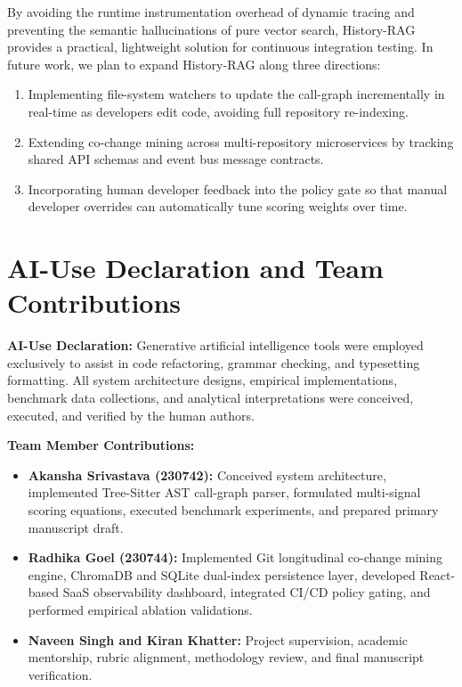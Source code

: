 \documentclass[12pt,onecolumn,draftclsnofoot]{IEEEtran}
\begin{document}
By avoiding the runtime instrumentation overhead of dynamic tracing and preventing the semantic hallucinations of pure vector search, History-RAG provides a practical, lightweight solution for continuous integration testing. In future work, we plan to expand History-RAG along three directions:
\begin{enumerate}
    \item Implementing file-system watchers to update the call-graph incrementally in real-time as developers edit code, avoiding full repository re-indexing.
    \item Extending co-change mining across multi-repository microservices by tracking shared API schemas and event bus message contracts.
    \item Incorporating human developer feedback into the policy gate so that manual developer overrides can automatically tune scoring weights over time.
\end{enumerate}

\section*{AI-Use Declaration and Team Contributions}
\noindent\textbf{AI-Use Declaration:} Generative artificial intelligence tools were employed exclusively to assist in code refactoring, grammar checking, and typesetting formatting. All system architecture designs, empirical implementations, benchmark data collections, and analytical interpretations were conceived, executed, and verified by the human authors.

\noindent\textbf{Team Member Contributions:}
\begin{itemize}
    \item \textbf{Akansha Srivastava (230742):} Conceived system architecture, implemented Tree-Sitter AST call-graph parser, formulated multi-signal scoring equations, executed benchmark experiments, and prepared primary manuscript draft.
    \item \textbf{Radhika Goel (230744):} Implemented Git longitudinal co-change mining engine, ChromaDB and SQLite dual-index persistence layer, developed React-based SaaS observability dashboard, integrated CI/CD policy gating, and performed empirical ablation validations.
    \item \textbf{Naveen Singh and Kiran Khatter:} Project supervision, academic mentorship, rubric alignment, methodology review, and final manuscript verification.
\end{itemize}



\end{document}
